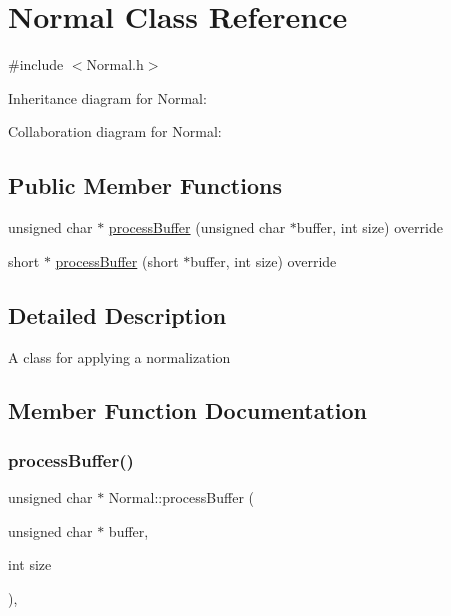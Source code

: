 \hypertarget{classNormal}{}\section{Normal Class Reference}
\label{classNormal}


{\ttfamily \#include $<$Normal.\+h$>$}



Inheritance diagram for Normal\+:


Collaboration diagram for Normal\+:
\subsection*{Public Member Functions}
\begin{DoxyCompactItemize}
\item 
unsigned char $\ast$ \hyperlink{classNormal_a3cb50295766e591b7a108cd6e0fc71ba}{process\+Buffer} (unsigned char $\ast$buffer, int size) override
\item 
short $\ast$ \hyperlink{classNormal_a243a816f6a995ca5145a160b3b3d8b8f}{process\+Buffer} (short $\ast$buffer, int size) override
\end{DoxyCompactItemize}


\subsection{Detailed Description}
A class for applying a normalization 

\subsection{Member Function Documentation}
\mbox{\label{classNormal_a3cb50295766e591b7a108cd6e0fc71ba}} 
\subsubsection{\texorpdfstring{process\+Buffer()}{processBuffer()}\hspace{0.1cm}{\footnotesize\ttfamily [1/2]}}
{\footnotesize\ttfamily unsigned char $\ast$ Normal\+::process\+Buffer (\begin{DoxyParamCaption}\item[{unsigned char $\ast$}]{buffer,  }\item[{int}]{size }\end{DoxyParamCaption})\hspace{0.3cm}{\ttfamily [override]}, {\ttfamily [virtual]}}

